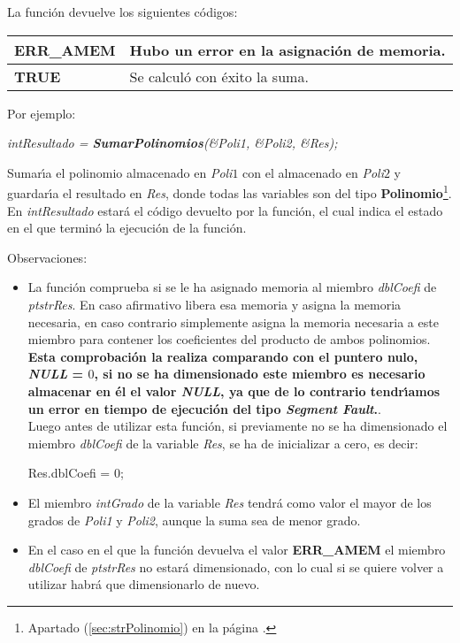 La funci\'on devuelve los siguientes c\'odigos:

\begin{center}
\begin{tabular}{|l|l|}
\hline
\textbf{ERR\_AMEM} & Hubo un error en la asignaci\'on de memoria. \\
\hline
\textbf{TRUE} & Se calcul\'o con \'exito la suma. \\
\hline
\end{tabular}
\end{center}

Por ejemplo:

\begin{center}
\emph{intResultado = \textbf{SumarPolinomios}(\&Poli1, \&Poli2, \&Res);}
\end{center}

Sumar\'{\i}a el polinomio almacenado en \emph{Poli$1$} con el almacenado
en \emph{Poli$2$} y guardar\'{\i}a el resultado en \emph{Res}, donde todas las
variables son del tipo \textbf{Polinomio}\footnote{Apartado 
(\ref{sec:strPolinomio}) en la p\'agina \pageref{sec:strPolinomio}.}.\\

En \emph{intResultado} estar\'a el c\'odigo devuelto por la funci\'on, el cual
indica el estado en el que termin\'o la ejecuci\'on de la funci\'on.\newline

Observaciones:

\begin{itemize}
\item La funci\'on comprueba si se le ha asignado memoria al miembro 
\emph{dblCoefi} de \emph{ptstrRes}. En caso afirmativo libera esa
memoria y asigna la memoria necesaria, en caso contrario simplemente asigna
la memoria necesaria a este miembro para contener los coeficientes del
producto de ambos polinomios.\\

\textbf{Esta comprobaci\'on la realiza comparando con el puntero nulo, 
\emph{NULL} = $0$, si no se ha dimensionado este miembro es necesario almacenar
en \'el el valor \emph{NULL}, ya que de lo contrario tendr\'{\i}amos un error
en tiempo de ejecuci\'on del tipo \emph{Segment Fault}.}.\\

Luego antes de utilizar esta funci\'on, si previamente no se ha dimensionado
el miembro \emph{dblCoefi} de la variable \emph{Res}, se ha de inicializar
a cero, es decir:

\begin{center}
Res.dblCoefi = 0;
\end{center}
\item El miembro \emph{intGrado} de la variable \emph{Res} tendr\'a como
valor el mayor de los grados de \emph{Poli1} y \emph{Poli2}, aunque la suma
sea de menor grado.
\item En el caso en el que la funci\'on devuelva el valor \textbf{ERR\_AMEM} el
miembro \emph{dblCoefi} de \emph{ptstrRes} no estar\'a dimensionado, con lo
cual si se quiere volver a utilizar habr\'a que dimensionarlo de nuevo.
\end{itemize}

